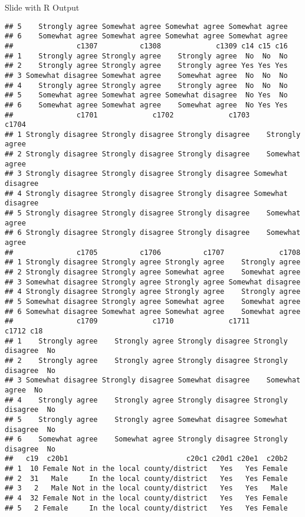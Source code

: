 \documentclass[
  ignorenonframetext,
]{beamer}
\begin{document}
\begin{frame}[fragile]{Slide with R Output}
\begin{verbatim}
## 5    Strongly agree Somewhat agree Somewhat agree Somewhat agree
## 6    Somewhat agree Somewhat agree Somewhat agree Somewhat agree
##               c1307          c1308             c1309 c14 c15 c16
## 1    Strongly agree Strongly agree    Strongly agree  No  No  No
## 2    Strongly agree Strongly agree    Strongly agree Yes Yes Yes
## 3 Somewhat disagree Somewhat agree    Somewhat agree  No  No  No
## 4    Strongly agree Strongly agree    Strongly agree  No  No  No
## 5    Somewhat agree Somewhat agree Somewhat disagree  No Yes  No
## 6    Somewhat agree Somewhat agree    Somewhat agree  No Yes Yes
##               c1701             c1702             c1703             c1704
## 1 Strongly disagree Strongly disagree Strongly disagree    Strongly agree
## 2 Strongly disagree Strongly disagree Strongly disagree    Somewhat agree
## 3 Strongly disagree Strongly disagree Strongly disagree Somewhat disagree
## 4 Strongly disagree Strongly disagree Strongly disagree Somewhat disagree
## 5 Strongly disagree Strongly disagree Strongly disagree    Somewhat agree
## 6 Strongly disagree Strongly disagree Strongly disagree    Somewhat agree
##               c1705          c1706          c1707             c1708
## 1 Strongly disagree Strongly agree Strongly agree    Strongly agree
## 2 Strongly disagree Strongly agree Somewhat agree    Somewhat agree
## 3 Somewhat disagree Strongly agree Strongly agree Somewhat disagree
## 4 Strongly disagree Strongly agree Strongly agree    Strongly agree
## 5 Somewhat disagree Strongly agree Somewhat agree    Somewhat agree
## 6 Somewhat disagree Somewhat agree Somewhat agree    Somewhat agree
##               c1709             c1710             c1711             c1712 c18
## 1    Strongly agree    Strongly agree Strongly disagree Strongly disagree  No
## 2    Strongly agree    Strongly agree Strongly disagree Strongly disagree  No
## 3 Somewhat disagree Strongly disagree Somewhat disagree    Somewhat agree  No
## 4    Strongly agree    Strongly agree Strongly disagree Strongly disagree  No
## 5    Strongly agree    Strongly agree Somewhat disagree Somewhat disagree  No
## 6    Somewhat agree    Somewhat agree Strongly disagree Strongly disagree  No
##   c19  c20b1                            c20c1 c20d1 c20e1  c20b2
## 1  10 Female Not in the local county/district   Yes   Yes Female
## 2  31   Male     In the local county/district   Yes   Yes Female
## 3   2   Male Not in the local county/district   Yes   Yes   Male
## 4  32 Female Not in the local county/district   Yes   Yes Female
## 5   2 Female     In the local county/district   Yes   Yes Female

\end{verbatim}
\end{frame}
\end{document}
